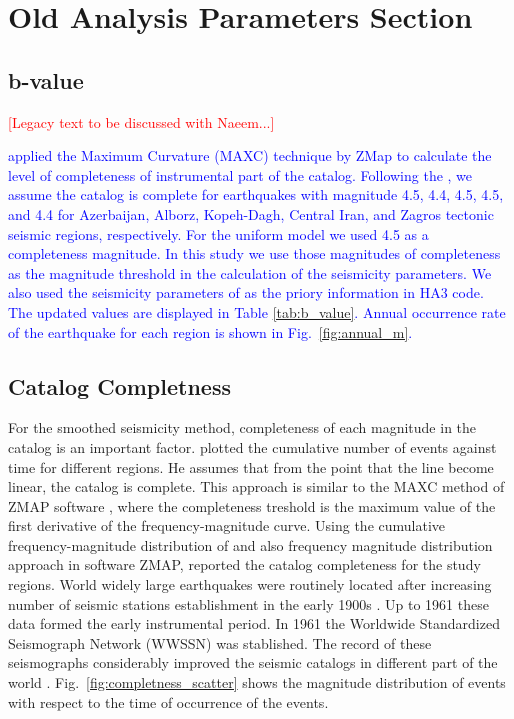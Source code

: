 \section{Old Analysis Parameters Section}

\subsection{b-value}

\textcolor{red}{
[Legacy text to be discussed with Naeem...]\\
}

\textcolor{blue}{
\citet{Karimiparidari2013} applied the Maximum Curvature (MAXC) technique \citep{Wyss1999, Wiemer2000} by ZMap \citep{Wiemer2001} to calculate the level of completeness of instrumental part of the catalog.  Following the \citet{Karimiparidari2013}, we assume the catalog is complete for earthquakes with magnitude 4.5, 4.4, 4.5, 4.5, and 4.4 for Azerbaijan, Alborz,  Kopeh-Dagh, Central Iran, and Zagros tectonic seismic regions, respectively. For the uniform model we used 4.5 as a completeness magnitude. In this study we use those magnitudes of completeness as the magnitude threshold in the calculation of the seismicity parameters. We also used the seismicity parameters of \citet{Karimiparidari2013} as the priory information in HA3 code. The updated values are displayed in Table \ref{tab:b_value}.  Annual occurrence rate of the earthquake for each region is shown in Fig.~\ref{fig:annual_m}.
}

\subsection{Catalog Completness}

For the smoothed seismicity method, completeness of each magnitude in the catalog is an important factor.  \citet{Frankel1995} plotted the cumulative number of events against time for different regions. He assumes that from the point that the line become linear, the catalog is complete. This approach is similar to the MAXC method of ZMAP software \citep{Wiemer2001}, where the completeness treshold is the maximum value of the first derivative of the frequency-magnitude curve. Using the cumulative frequency-magnitude distribution of \citet{Gutenberg1944} and also frequency magnitude distribution approach in software ZMAP, \citet{Zare2014} reported the catalog completeness for the study regions. World widely large earthquakes were routinely located after increasing number of seismic stations establishment in the early 1900s \citep{Shearer2009}. Up to 1961 these data formed the early instrumental period. In 1961 the Worldwide Standardized Seismograph Network (WWSSN) was stablished. The record of these seismographs considerably improved the seismic catalogs in different part of the world \citep{Shearer2009}. Fig.~\ref{fig:completness_scatter} shows the magnitude distribution of events with respect to the time of occurrence of the events.

